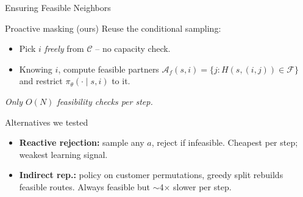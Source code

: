 \documentclass{beamer}
\begin{document}
\begin{frame}{Ensuring Feasible Neighbors}
  \begin{block}{Proactive masking (ours)}
    \small Reuse the conditional sampling:\\[0.2em]
    \begin{itemize}\itemsep1pt
      \item Pick $i$ \emph{freely} from $\mathcal{C}$ -- no capacity check.
      \item Knowing $i$, compute feasible partners
            $\mathcal{A}_f(s,i) = \{ j : H(s,(i,j)) \in \mathcal{F} \}$
            and restrict $\pi_\theta(\cdot \mid s, i)$ to it.
    \end{itemize}
    \emph{Only $O(N)$ feasibility checks per step.}
  \end{block}
  \vspace{0.3em}
  \begin{block}{Alternatives we tested}
    \small
    \begin{itemize}\itemsep1pt
      \item \textbf{Reactive rejection:} sample any $a$, reject if
            infeasible. Cheapest per step; weakest learning signal.
      \item \textbf{Indirect rep.:} policy on customer permutations,
            greedy split rebuilds feasible routes. Always feasible but
            $\sim$4$\times$ slower per step.
    \end{itemize}
  \end{block}
\end{frame}
\end{document}
